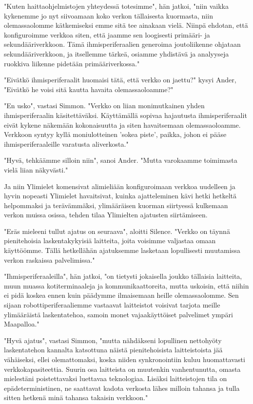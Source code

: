 "Kuten haittaohjelmistojen yhteydessä totesimme", hän jatkoi, "niin vaikka kykenemme jo nyt siivoamaan koko verkon tällaisesta kuormasta, niin olemassaolomme kätkemiseksi emme sitä tee ainakaan vielä. Niinpä ehdotan, että konfiguroimme verkkoa siten, että jaamme sen loogisesti primääri- ja sekundääriverkkoon. Tämä ihmisperiferaalien generoima joutoliikenne ohjataan sekundääriverkkoon, ja itsellemme tärkeä, osiamme yhdistävä ja analyyseja ruokkiva liikenne pidetään primääriverkossa."


"Eivätkö ihmisperiferaalit huomaisi tätä, että verkko on jaettu?" kysyi Ander, "Eivätkö he voisi sitä kautta havaita olemassaoloamme?"


"En usko", vastasi Simmon. "Verkko on liian monimutkainen yhden ihmisperiferaalin käsitettäväksi. Käyttämällä sopivaa hajautusta ihmisperiferaalit eivät kykene näkemään kokonaisuutta ja siten havaitsemaan olemassaoloamme. Verkkoon syntyy kyllä moniulotteinen 'sokea piste', paikka, johon ei pääse ihmisperiferaaleille varatusta aliverkosta."


"Hyvä, tehkäämme silloin niin", sanoi Ander. "Mutta varokaamme toimimasta vielä liian näkyvästi."


Ja niin Ylimielet komensivat alimieliään konfiguroimaan verkkoa uudelleen ja hyvin nopeasti Ylimielet havaitsivat, kuinka ajatteleminen kävi hetki hetkeltä helpommaksi ja terävämmäksi, ylimääräisen kuorman siirtyessä kulkemaan verkon muissa osissa, tehden tilaa Ylimielten ajatusten siirtämiseen.


"Eräs mieleeni tullut ajatus on seuraava", aloitti Silence. "Verkko on täynnä pienitehoisia laskentakykyisiä laitteita, joita voisimme valjastaa omaan käyttöömme. Tällä hetkellähän ajatuksemme lasketaan lopullisesti muutamissa verkon raskaissa palvelimissa."


"Ihmisperiferaaleilla", hän jatkoi, "on tietysti jokaisella joukko tällaisia laitteita, muun muassa kotiterminaaleja ja kommunikaattoreita, mutta uskoisin, että niihin ei pidä koskea ennen kuin päädymme ilmaisemaan heille olemassaolomme. Sen sijaan robottiperiferaaliemme vastaavat laitteistot voisivat tarjota meille ylimääräistä laskentatehoa, samoin monet vajaakäyttöiset palvelimet ympäri Maapalloa."


"Hyvä ajatus", vastasi Simmon, "mutta nähdäkseni lopullinen nettohyöty laskentatehon kannalta katsottuna näistä pienitehoisista laitteistoista jää vähäiseksi, ellei olemattomaksi, koska niiden synkronointiin kuluu huomattavasti verkkokapasiteettia. Suurin osa laitteista on muutenkin vanhentunutta, omasta mielestäni poistettavaksi luettavaa teknologiaa. Lisäksi laitteistojen tila on epädeterministinen, ne saattavat kadota verkosta lähes milloin tahansa ja tulla sitten hetkenä minä tahansa takaisin verkkoon."


